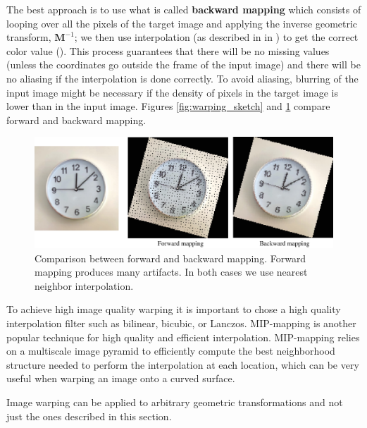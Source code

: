 The best approach is to use what is called {\bf backward mapping} 
which consists of looping over all the pixels of the target image and applying the inverse geometric transform, $\mathbf{M}^{-1}$; we then use interpolation (as described in \sect{\ref{sec:interpolation}} in \chap{\ref{chap:downsampling_and_upsampling}}) to get the correct color value (\fig{\ref{fig:warping_sketch}}). This process guarantees that there will be no missing values (unless the coordinates go outside the frame of the input image) and there will be no aliasing if the interpolation is done correctly. To avoid aliasing, blurring of the input image might be necessary if the density of pixels in the target image is lower than in the input image. Figures \ref{fig:warping_sketch} and \ref{fig:warping_forward_backward} compare forward and backward mapping. 


\begin{figure}[t]
\centerline{
\includegraphics[width=1\linewidth]{figures/imaging_geometry/warping_forward_backward.eps}
}
\caption{Comparison between forward and backward mapping. Forward mapping produces many artifacts. In both cases we use nearest neighbor interpolation.}
\label{fig:warping_forward_backward}
\end{figure}


To achieve high image quality warping it is important to chose a high quality interpolation filter such as bilinear, bicubic, or Lanczos. MIP-mapping \cite{Lance1983} is another popular technique for high quality and efficient interpolation. MIP-mapping relies on a multiscale image pyramid to efficiently compute the best neighborhood structure needed to perform the interpolation at each location, which can be very useful when warping an image onto a curved surface. 

Image warping can be applied to arbitrary geometric transformations and not just the ones described in this section. 




